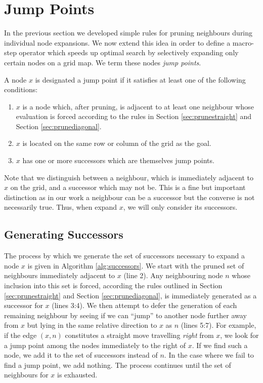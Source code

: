 \section{Jump Points}
In the previous section we developed simple rules for pruning neighbours during 
individual node expansions. We now extend this idea in order to define a 
macro-step operator which speeds up optimal search by selectively expanding
only certain nodes on a grid map. We term these nodes \emph{jump points}.

\begin{definition}
\label{def:jump}
A node $x$ is designated a jump point if it satisfies at least one of the following
conditions:
\begin{enumerate}
\item{$x$ is a node which, after pruning, is adjacent to at least one neighbour
whose evaluation is forced according to the rules in Section
\ref{sec:prunestraight} and Section \ref{sec:prunediagonal}.}
\item{$x$ is located on the same row or column of the grid as the goal.}
\item{$x$ has one or more successors which are themselves jump points.}
\end{enumerate}
\end{definition}

Note that we distinguish between a neighbour, which is immediately adjacent to
$x$ on the grid, and a successor which may not be. 
This is a fine but important distinction as in our work a neighbour can be a 
successor but the converse is not necessarily true.
Thus, when expand $x$, we will only consider its successors.

\subsection{Generating Successors}
The process by which we generate the set of successors necessary to expand a
node $x$ is given in Algorithm \ref{alg:successors}.
We start with the pruned set of neighbours immediately adjacent to $x$ (line 2).
Any neighbouring node $n$ whose inclusion into this set is forced, according the 
rules outlined in Section \ref{sec:prunestraight} and Section 
\ref{sec:prunediagonal}, is immediately generated as a successor for $x$ 
(lines 3:4).
We then attempt to defer the generation of each remaining neighbour by seeing if 
we can ``jump'' to another node further away from $x$ but lying in the same 
relative direction to $x$ as $n$ (lines 5:7). For example, if the edge $(x, n)$ constitutes a
straight move travelling \emph{right} from $x$, we look for a jump point among
the nodes immediately to the right of $x$.
If we find such a node, we add it to the set of successors instead of $n$.
In the case where we fail to find a jump point, we add nothing.
The process continues until the set of neighbours for $x$ is exhausted.

